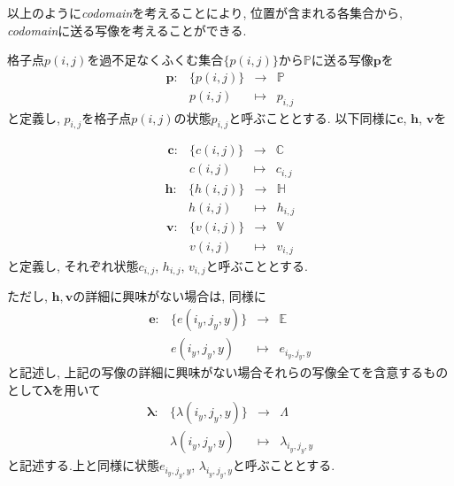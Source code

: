 以上のように\textit{codomain}を考えることにより, 位置が含まれる各集合から, \textit{codomain}に送る写像を考えることができる.
\begin{definition}[写像$\bm{p}$, $\bm{c}$, $\bm{h}$, $\bm{v}$]\label{definition:Mapping}
  格子点$p(i,j)$を過不足なくふくむ集合$\{p(i,j)\}$から$\mathbb{P}$に送る写像$\bm{p}$を
  \begin{equation}
    \begin{array}{rccc}
      \bm{p}\colon & \{p(i,j)\} & \longrightarrow & \mathbb{P} \\
                   & p(i,j)     & \longmapsto     & p_{i,j}
    \end{array}
  \end{equation}
  と定義し, $p_{i,j}$を格子点$p(i,j)$の状態$p_{i,j}$と呼ぶこととする.
  以下同様に$\bm{c}$, $\bm{h}$, $\bm{v}$を

  \begin{equation}
    \begin{array}{rccc}
      \bm{c}\colon & \{c(i,j)\} & \longrightarrow & \mathbb{C} \\
                   & c(i,j)     & \longmapsto     & c_{i,j}
    \end{array}
  \end{equation}
  \begin{equation}
    \begin{array}{rccc}
      \bm{h}\colon & \{h(i,j)\} & \longrightarrow & \mathbb{H} \\
                   & h(i,j)     & \longmapsto     & h_{i,j}
    \end{array}
  \end{equation}
  \begin{equation}
    \begin{array}{rccc}
      \bm{v}\colon & \{v(i,j)\} & \longrightarrow & \mathbb{V} \\
                   & v(i,j)     & \longmapsto     & v_{i,j}
    \end{array}
  \end{equation}
  と定義し, それぞれ状態$c_{i,j}$, $h_{i,j}$, $v_{i,j}$と呼ぶこととする.

  ただし, $\bm{h},\bm{v}$の詳細に興味がない場合は, 同様に
  \begin{equation}
    \begin{array}{rccc}
      \bm{e}\colon & \{e(i_y,j_y,y)\} & \longrightarrow & \mathbb{E}    \\
                   & e(i_y,j_y,y)     & \longmapsto     & e_{i_y,j_y,y}
    \end{array}
  \end{equation}
  と記述し, 上記の写像の詳細に興味がない場合それらの写像全てを含意するものとして$\bm{\lambda}$を用いて
  \begin{equation}
    \begin{array}{rccc}
      \bm{\lambda}\colon & \{\lambda(i_y,j_y,y)\} & \longrightarrow & \Lambda             \\
                         & \lambda(i_y,j_y,y)     & \longmapsto     & \lambda_{i_y,j_y,y}
    \end{array}
  \end{equation}
  と記述する.上と同様に状態$e_{i_y,j_y,y}$, $\lambda_{i_y,j_y,y}$と呼ぶこととする.
\end{definition}
